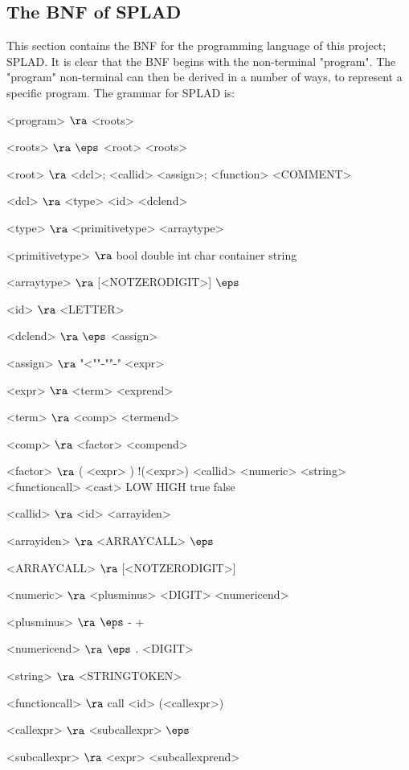 \subsection{The BNF of SPLAD}
This section contains the BNF for the programming language of this project; SPLAD. It is clear that the BNF begins with the non-terminal "program". The "program" non-terminal can then be derived in a number of ways, to represent a specific program. The grammar for SPLAD is:

\begin{grammar}
<program> $\ra$ <roots>

<roots> $\ra$ $\eps$
\alt <root> <roots>
 
<root> $\ra$ <dcl>;
\alt <callid> <assign>;
\alt <function>
\alt <COMMENT>

<dcl> $\ra$ <type> <id> <dclend>

<type> $\ra$ <primitivetype> <arraytype>

<primitivetype> $\ra$ bool
\alt double
\alt int
\alt char
\alt container
\alt string

<arraytype> $\ra$ [<NOTZERODIGIT>]
\alt$\eps$

<id> $\ra$ <LETTER>

<dclend> $\ra$ $\eps$
\alt <assign> 

<assign> $\ra$ "<""-""-" <expr>

<expr> $\ra$ <term> <exprend>

<term> $\ra$ <comp> <termend>

<comp> $\ra$ <factor> <compend>

<factor> $\ra$ ( <expr> )
	\alt !(<expr>)
	\alt <callid>
	\alt <numeric>
	\alt <string>
	\alt <functioncall> 
	\alt <cast>
	\alt LOW
	\alt HIGH
	\alt true
	\alt false

<callid> $\ra$ <id> <arrayiden>

<arrayiden> $\ra$ <ARRAYCALL>
\alt $\eps$

<ARRAYCALL> $\ra$ [<NOTZERODIGIT>]

<numeric> $\ra$ <plusminus> <DIGIT> <numericend>

<plusminus> $\ra$ $\eps$
	\alt -
	\alt +

<numericend> $\ra$ $\eps$
\alt . <DIGIT>

<string> $\ra$ <STRINGTOKEN>

<functioncall> $\ra$ call <id> (<callexpr>)

<callexpr> $\ra$ <subcallexpr>
\alt$\eps$

<subcallexpr> $\ra$ <expr> <subcallexprend>


\end{grammar}
